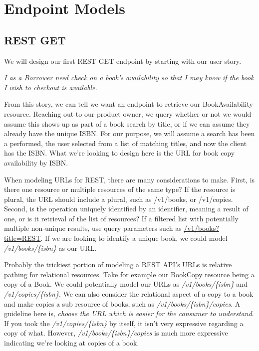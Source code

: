 \chapter{Endpoint Models}

\section{REST GET}

We will design our first REST GET endpoint by starting with our user story.

\textit{I as a Borrower need check on a book's availability so that I may know if the book I wish to checkout is available.}

From this story, we can tell we want an endpoint to retrieve our BookAvailability resource.  Reaching out to our product owner, we query whether or not we would assume this shows up as part of a book search by title, or if we can assume they already have the unique ISBN.  For our purpose, we will assume a search has been a performed, the user selected from a list of matching titles, and now the client has the ISBN.  What we're looking to design here is the URL for book copy availability by ISBN.

When modeling URLs for REST, there are many considerations to make.  First, is there one resource or multiple resources of the same type?  If the resource is plural, the URL should include a plural, such as /v1/books, or /v1/copies.  Second, is the operation uniquely identified by an identifier, meaning a result of one, or is it retrieval of the list of resources?  If a filtered list with potentially multiple non-unique results, use query parameters such as \url{/v1/books?title=REST}.  If we are looking to identify a unique book, we could model \textit{/v1/books/\{isbn\}} as our URL.

Probably the trickiest portion of modeling a REST API's URLs is relative pathing for relational resources.  Take for example our BookCopy resource being a copy of a Book.  We could potentially model our URLs as \textit{/v1/books/\{isbn\}} and \textit{/v1/copies/\{isbn\}}.  We can also consider the relational aspect of a copy to a book and make copies a sub resource of books, such as \textit{/v1/books/\{isbn\}/copies}.  A guideline here is, \textit{choose the URL which is easier for the consumer to understand}.  If you took the \textit{/v1/copies/\{isbn\}} by itself, it isn't very expressive regarding a copy of what.  However, \textit{/v1/books/\{isbn\}/copies} is much more expressive indicating we're looking at copies of a book.

